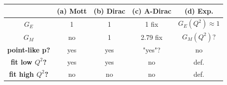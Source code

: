 \begin{center}
    \begin{tabular}{|c|c|c|c|c|}
        \hline
        & \textbf{(a) Mott} & \textbf{(b) Dirac} & \textbf{(c) A-Dirac} & \textbf{(d) Exp.} \\
        \hline
        $G_E$ & 1 & 1 & 1 fix & $G_E(Q^2) \approx 1$ \\
        \hline
        $G_M$ & no & 1 & 2.79 fix & $G_M(Q^2)$? \\
        \hline
        \textbf{point-like p?} & yes & yes & "yes"? & no \\
        \hline
        \textbf{fit low $Q^2$?} & yes & yes & no & def. \\
        \hline
        \textbf{fit high $Q^2$?} & no & no & no & def. \\
        \hline
    \end{tabular}
    \end{center}
